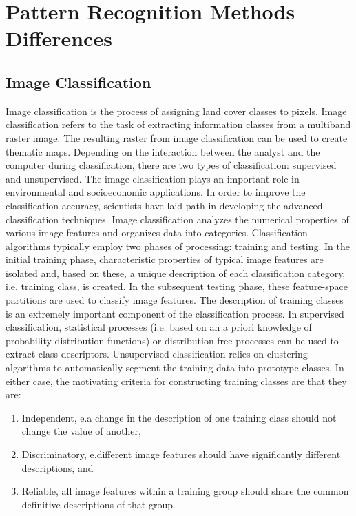 \section{Pattern Recognition Methods Differences}\label{s:patt}

\subsection{Image Classification}\label{s:patt-class}
Image classification is the process of assigning land cover classes to pixels. Image classification refers to the task of extracting information classes from a multiband raster image. The resulting raster from image classification can be used to create thematic maps. Depending on the interaction between the analyst and the computer during classification, there are two types of classification: supervised and unsupervised. The image classification plays an important role in environmental and socioeconomic applications. In order to improve the classification accuracy, scientists have laid path in developing the advanced classification techniques.
Image classification analyzes the numerical properties of various image features and organizes data into categories. Classification algorithms typically employ two phases of processing: training and testing. In the initial training phase, characteristic properties of typical image features are isolated and, based on these, a unique description of each classification category, i.e. training class, is created. In the subsequent testing phase, these feature-space partitions are used to classify image features. The description of training classes is an extremely important component of the classification process. In supervised classification, statistical processes (i.e. based on an a priori knowledge of probability distribution functions) or distribution-free processes can be used to extract class descriptors. Unsupervised classification relies on clustering algorithms to automatically segment the training data into prototype classes. In either case, the motivating criteria for constructing training classes are that they are:
\begin{enumerate}
	\item Independent, e.a change in the description of one training class should not change the value of another,
	\item Discriminatory, e.different image features should have significantly different descriptions, and
	\item Reliable, all image features within a training group should share the common definitive descriptions of that group.
\end{enumerate}

